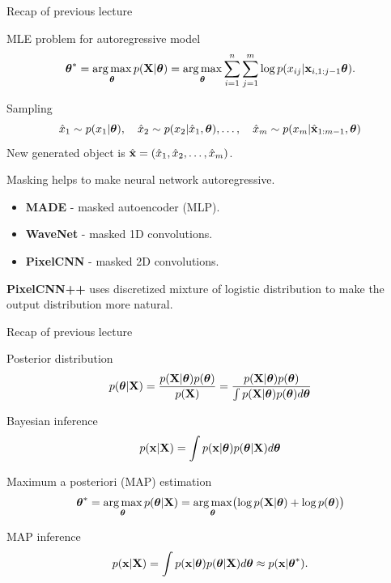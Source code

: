 

\begin{frame}
\titlepage
\end{frame}
\begin{frame}{Recap of previous lecture}
	\begin{block}{MLE problem for autoregressive model}
		\vspace{-0.7cm}
		\[
		\boldsymbol{\theta}^* = \operatorname*{arg\,max}_{\boldsymbol{\theta}} p(\mathbf{X} | \boldsymbol{\theta}) = \operatorname*{arg\,max}_{\boldsymbol{\theta}} \sum_{i=1}^n \sum_{j=1}^m \log p(x_{ij} | \mathbf{x}_{i, 1:j - 1}\boldsymbol{\theta}).
		\]
		\vspace{-0.7cm}
	\end{block}
	\begin{block}{Sampling}
		\vspace{-0.5cm}
		\[
			\hat{x}_1 \sim p(x_1 | \boldsymbol{\theta}), \quad \hat{x}_2 \sim p(x_2 | \hat{x}_1, \boldsymbol{\theta}), \dots, \quad \hat{x}_m \sim p(x_m | \hat{\mathbf{x}}_{1:m-1}, \boldsymbol{\theta})
		\]
		New generated object is $\hat{\mathbf{x}} = (\hat{x}_1, \hat{x}_2, \dots, \hat{x}_m)$.
	\end{block}
	Masking helps to make neural network autoregressive.
	\begin{itemize}
		\item \textbf{MADE} - masked autoencoder (MLP).
		\item \textbf{WaveNet} - masked 1D convolutions.
		\item \textbf{PixelCNN} - masked 2D convolutions.
	\end{itemize}
	\textbf{PixelCNN++} uses discretized mixture of logistic distribution to make the output distribution more natural.
\end{frame}
\begin{frame}{Recap of previous lecture}
	\begin{block}{Posterior distribution}
		\[
		p(\boldsymbol{\theta} | \mathbf{X}) = \frac{p(\mathbf{X} | \boldsymbol{\theta}) p(\boldsymbol{\theta})}{p(\mathbf{X})} = \frac{p(\mathbf{X} | \boldsymbol{\theta}) p(\boldsymbol{\theta})}{\int p(\mathbf{X} | \boldsymbol{\theta}) p(\boldsymbol{\theta}) d \boldsymbol{\theta}} 
		\]
		\vspace{-0.2cm}
	\end{block}
	\begin{block}{Bayesian inference}
		\vspace{-0.2cm}
		\[
		p(\mathbf{x} | \mathbf{X}) = \int p(\mathbf{x} | \boldsymbol{\theta}) p(\boldsymbol{\theta} | \mathbf{X}) d \boldsymbol{\theta}
		\]
		\vspace{-0.2cm}
	\end{block}
	\begin{block}{Maximum a posteriori (MAP) estimation}
		\vspace{-0.2cm}
		\[
		\boldsymbol{\theta}^* = \operatorname*{arg\,max}_{\boldsymbol{\theta}} p(\boldsymbol{\theta} | \mathbf{X}) = \operatorname*{arg\,max}_{\boldsymbol{\theta}} \bigl(\log p(\mathbf{X} | \boldsymbol{\theta}) + \log p(\boldsymbol{\theta}) \bigr)
		\]
		\vspace{-0.2cm}
	\end{block}
	\begin{block}{MAP inference}
		\[
		p(\mathbf{x} | \mathbf{X}) = \int p(\mathbf{x}| \boldsymbol{\theta}) p(\boldsymbol{\theta} | \mathbf{X} ) d \boldsymbol{\theta} \approx p(\mathbf{x} | \boldsymbol{\theta}^*).
		\]
	\end{block}
\end{frame}

